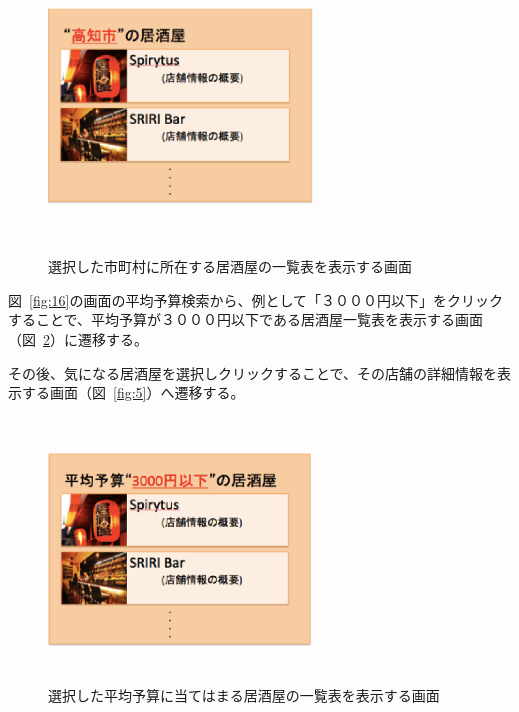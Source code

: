 \begin {figure}[!htbp]
    \begin{center}
    \includegraphics [height=7cm, width=7cm]{17.eps}
　　    \caption {選択した市町村に所在する居酒屋の一覧表を表示する画面}
    \label {fig:17}
    \end{center}
\end {figure}



図~\ref{fig:16}の画面の平均予算検索から、例として「３０００円以下」をクリックすることで、平均予算が３０００円以下である居酒屋一覧表を表示する画面（図~\ref{fig:18}）に遷移する。



その後、気になる居酒屋を選択しクリックすることで、その店舗の詳細情報を表示する画面（図~\ref{fig:5}）へ遷移する。
\clearpage

\begin {figure}[!htbp]
    \begin{center}
    \includegraphics [height=7cm, width=7cm]{18.eps}
    \caption {選択した平均予算に当てはまる居酒屋の一覧表を表示する画面}
    \label {fig:18}
    \end{center}
\end {figure}



